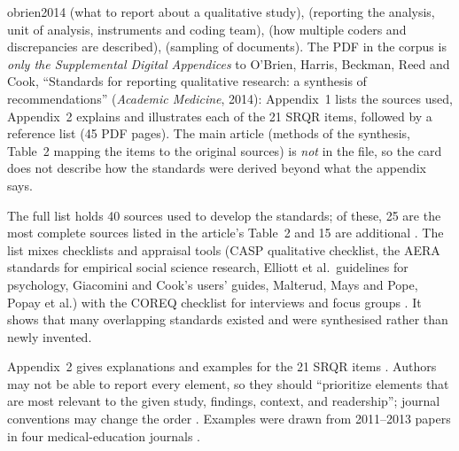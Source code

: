 \begin{papercard}{obrien2014}
  (what to report about a qualitative study),  (reporting the analysis, unit of analysis, instruments and coding team),  (how multiple coders and discrepancies are described),  (sampling of documents). The PDF in the corpus is \emph{only the Supplemental Digital Appendices} to O'Brien, Harris, Beckman, Reed and Cook, ``Standards for reporting qualitative research: a synthesis of recommendations'' (\emph{Academic Medicine}, 2014): Appendix~1 lists the sources used, Appendix~2 explains and illustrates each of the 21 SRQR items, followed by a reference list (45 PDF pages). The main article (methods of the synthesis, Table~2 mapping the items to the original sources) is \emph{not} in the file, so the card does not describe how the standards were derived beyond what the appendix says.

 The full list holds 40 sources used to develop the standards; of these, 25 are the most complete sources listed in the article's Table~2 and 15 are additional . The list mixes checklists and appraisal tools (CASP qualitative checklist, the AERA standards for empirical social science research, Elliott et al.\ guidelines for psychology, Giacomini and Cook's users' guides, Malterud, Mays and Pope, Popay et al.) with the COREQ checklist for interviews and focus groups . It shows that many overlapping standards existed and were synthesised rather than newly invented.

 Appendix~2 gives explanations and examples for the 21 SRQR items . Authors may not be able to report every element, so they should ``prioritize elements that are most relevant to the given study, findings, context, and readership''; journal conventions may change the order . Examples were drawn from 2011--2013 papers in four medical-education journals .


\end{papercard}
